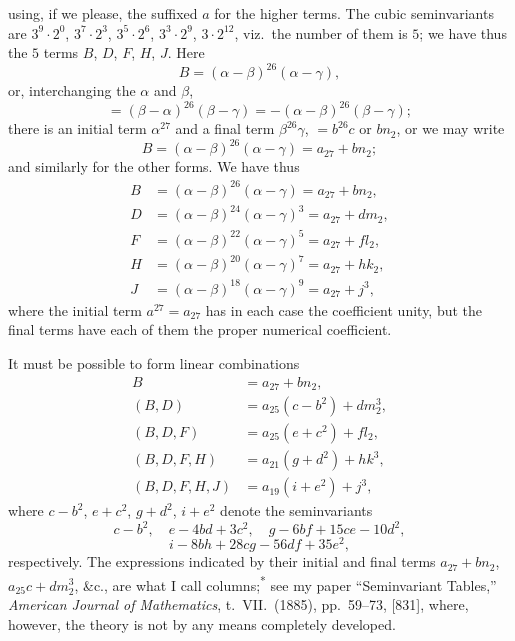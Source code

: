 \documentclass[11pt]{article}
\begin{document}
\noindent using, if we please, the suffixed $a$ for the higher terms. The cubic seminvariants are $3^{9} \cdot 2^{0}$, $3^{7}\cdot 2^{3}$, $3^{5}\cdot 2^{6}$, $3^{3}\cdot 2^{9}$, $3\cdot 2^{12}$, viz.\ the number of them is $5$; we have thus the $5$ terms $B$, $D$, $F$, $H$, $J$. Here
\[
B = (\alpha - \beta)^{26}(\alpha - \gamma),
\]
or, interchanging the $\alpha$ and $\beta$,
\[
= (\beta - \alpha)^{26}(\beta - \gamma) = -(\alpha - \beta)^{26}(\beta - \gamma);
\]
there is an initial term $\alpha^{27}$ and a final term $\beta^{26}\gamma$, $= b^{26}c$ or $bn_{2}$, or we may write
\[
B = (\alpha - \beta)^{26}(\alpha - \gamma) = a_{27} + bn_{2};
\]
and similarly for the other forms. We have thus
\begin{align*}
B &= (\alpha - \beta)^{26}(\alpha - \gamma) = a_{27} + bn_{2}, \\
D &= (\alpha - \beta)^{24}(\alpha - \gamma)^{3} = a_{27} + dm_{2}, \\
F &= (\alpha - \beta)^{22}(\alpha - \gamma)^{5} = a_{27} + fl_{2}, \\
H &= (\alpha - \beta)^{20}(\alpha - \gamma)^{7} = a_{27} + hk_{2}, \\
J &= (\alpha - \beta)^{18}(\alpha - \gamma)^{9} = a_{27} + j^{3},
\end{align*}
where the initial term $a^{27} = a_{27}$ has in each case the coefficient unity, but the final terms have each of them the proper numerical coefficient.

It must be possible to form linear combinations
\begin{align*}
B &= a_{27} + bn_{2}, \\
(B, D) &= a_{25}(c - b^{2}) + dm_{2}^{3}, \\
(B, D, F) &= a_{25}(e + c^{2}) + fl_{2}, \\
(B, D, F, H) &= a_{21}(g + d^{2}) + hk^{3}, \\
(B, D, F, H, J) &= a_{19}(i + e^{2}) + j^{3},
\end{align*}
where $c - b^{2}$, $e + c^{2}$, $g + d^{2}$, $i + e^{2}$ denote the seminvariants
\[
c - b^{2},\quad e - 4bd + 3c^{2},\quad g - 6bf + 15ce - 10d^{2},
\]
\[
i - 8bh + 28cg - 56df + 35e^{2},
\]
respectively. The expressions indicated by their initial and final terms $a_{27} + bn_{2}$, $a_{25}c + dm_{2}^{3}$, \&c., are what I call columns;\textsuperscript{*} see my paper ``Seminvariant Tables,'' \textit{American Journal of Mathematics}, t.~VII.\ (1885), pp.~59--73, [831], where, however, the theory is not by any means completely developed.
\end{document}
